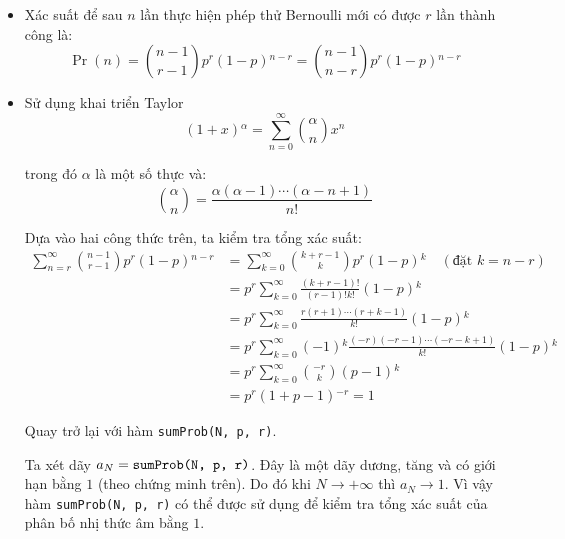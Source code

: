 \documentclass{article}
\begin{document}
\begin{itemize}
    \item Xác suất để sau $n$ lần thực hiện phép thử Bernoulli mới có được $r$ lần thành công là:
        \[ \Pr(n) = \binom{n - 1}{r - 1}p^{r}(1 - p){}^{n - r} = \binom{n - 1}{n - r}p^{r}(1 - p){}^{n - r} \]
    \item Sử dụng khai triển Taylor
        \[ (1 + x){}^{\alpha} = \sum^{\infty}_{n=0}\binom{\alpha}{n}x^{n}  \]
        \par trong đó $\alpha$ là một số thực và:
        \[ \binom{\alpha}{n} = \frac{\alpha(\alpha - 1)\cdots (\alpha - n + 1)}{n!} \]
        \par Dựa vào hai công thức trên, ta kiểm tra tổng xác suất:
        \begin{align*}
            \sum^{\infty}_{n=r}\binom{n-1}{r-1}p^{r}(1-p){}^{n-r} &= \sum^{\infty}_{k=0}\binom{k + r - 1}{k}p^{r}(1-p){}^{k}\quad(\text{đặt }k = n - r) \\
                                                                &= p^{r}\sum^{\infty}_{k=0}\frac{(k + r - 1)!}{(r - 1)!k!}(1 - p){}^{k} \\
                                                                &= p^{r}\sum^{\infty}_{k=0}\frac{r(r+1)\cdots (r + k - 1)}{k!}(1-p){}^{k} \\
                                                                &= p^{r}\sum^{\infty}_{k=0}(-1){}^{k}\frac{(-r)(-r - 1)\cdots (-r -k + 1)}{k!}(1-p){}^{k} \\
                                                                &= p^{r}\sum^{\infty}_{k=0}\binom{-r}{k}(p-1){}^{k} \\
                                                                &= p^{r}(1 + p - 1){}^{-r} = 1
        \end{align*}
        \par Quay trở lại với hàm \texttt{sumProb(N, p, r)}.
        \par Ta xét dãy $a_{N} = \text{\texttt{sumProb(N, p, r)}}$. Đây là một dãy dương, tăng và có giới hạn bằng $1$ (theo chứng minh trên). Do đó khi $N\to{+\infty}$ thì $a_{N}\to 1$. Vì vậy hàm \texttt{sumProb(N, p, r)} có thể được sử dụng để kiểm tra tổng xác suất của phân bố nhị thức âm bằng $1$.
\end{itemize}
\end{document}

